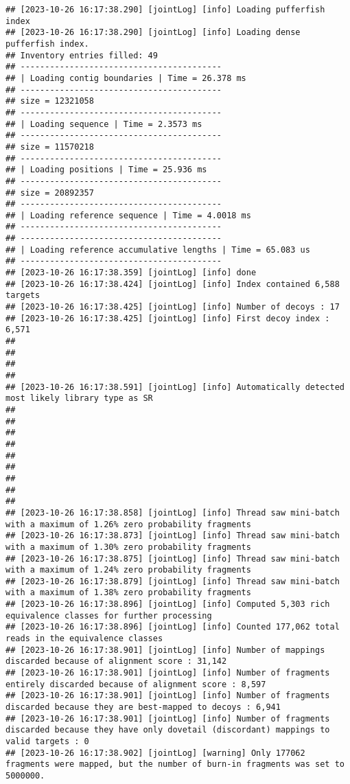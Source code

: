 \documentclass[
]{book}
\begin{document}
\begin{verbatim}
## [2023-10-26 16:17:38.290] [jointLog] [info] Loading pufferfish index
## [2023-10-26 16:17:38.290] [jointLog] [info] Loading dense pufferfish index.
## Inventory entries filled: 49
## -----------------------------------------
## | Loading contig boundaries | Time = 26.378 ms
## -----------------------------------------
## size = 12321058
## -----------------------------------------
## | Loading sequence | Time = 2.3573 ms
## -----------------------------------------
## size = 11570218
## -----------------------------------------
## | Loading positions | Time = 25.936 ms
## -----------------------------------------
## size = 20892357
## -----------------------------------------
## | Loading reference sequence | Time = 4.0018 ms
## -----------------------------------------
## -----------------------------------------
## | Loading reference accumulative lengths | Time = 65.083 us
## -----------------------------------------
## [2023-10-26 16:17:38.359] [jointLog] [info] done
## [2023-10-26 16:17:38.424] [jointLog] [info] Index contained 6,588 targets
## [2023-10-26 16:17:38.425] [jointLog] [info] Number of decoys : 17
## [2023-10-26 16:17:38.425] [jointLog] [info] First decoy index : 6,571 
## 
## 
## 
## 
## [2023-10-26 16:17:38.591] [jointLog] [info] Automatically detected most likely library type as SR
## 
## 
## 
## 
## 
## 
## 
## 
## 
## [2023-10-26 16:17:38.858] [jointLog] [info] Thread saw mini-batch with a maximum of 1.26% zero probability fragments
## [2023-10-26 16:17:38.873] [jointLog] [info] Thread saw mini-batch with a maximum of 1.30% zero probability fragments
## [2023-10-26 16:17:38.875] [jointLog] [info] Thread saw mini-batch with a maximum of 1.24% zero probability fragments
## [2023-10-26 16:17:38.879] [jointLog] [info] Thread saw mini-batch with a maximum of 1.38% zero probability fragments
## [2023-10-26 16:17:38.896] [jointLog] [info] Computed 5,303 rich equivalence classes for further processing
## [2023-10-26 16:17:38.896] [jointLog] [info] Counted 177,062 total reads in the equivalence classes 
## [2023-10-26 16:17:38.901] [jointLog] [info] Number of mappings discarded because of alignment score : 31,142
## [2023-10-26 16:17:38.901] [jointLog] [info] Number of fragments entirely discarded because of alignment score : 8,597
## [2023-10-26 16:17:38.901] [jointLog] [info] Number of fragments discarded because they are best-mapped to decoys : 6,941
## [2023-10-26 16:17:38.901] [jointLog] [info] Number of fragments discarded because they have only dovetail (discordant) mappings to valid targets : 0
## [2023-10-26 16:17:38.902] [jointLog] [warning] Only 177062 fragments were mapped, but the number of burn-in fragments was set to 5000000.

\end{verbatim}
\end{document}
